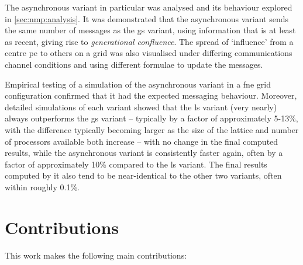 The asynchronous variant in particular was analysed and its behaviour explored in \cref{sec:nmp:analysis}.  It was demonstrated that the asynchronous variant sends the same number of messages as the \gls{gs} variant, using information that is at least as recent, giving rise to \emph{generational confluence}.  The spread of `influence' from a centre \gls{pe} to others on a grid was also visualised under differing communications channel conditions and using different formulae to update the messages.

Empirical testing of a simulation of the asynchronous variant in a \gls{fne} grid configuration confirmed that it had the expected messaging behaviour.  Moreover, detailed simulations of each variant showed that the \gls{ls} variant (very nearly) always outperforms the \gls{gs} variant -- typically by a factor of approximately 5-13\%, with the difference typically becoming larger as the size of the lattice and number of processors available both increase -- with no change in the final computed results, while the asynchronous variant is consistently faster again, often by a factor of approximately 10\% compared to the \gls{ls} variant.  The final results computed by it also tend to be near-identical to the other two variants, often within roughly 0.1\%.

\section{Contributions}
This work makes the following main contributions:

